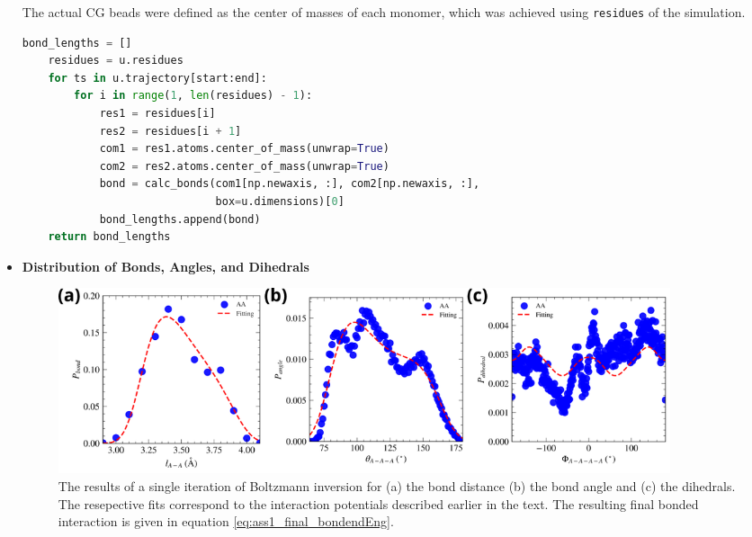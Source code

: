 \documentclass[10pt,a4paper]{labreport}
\begin{document}
\begin{itemize}
  The actual CG beads were defined as the center of masses of each monomer, which was achieved using \texttt{residues} of the simulation.
  
  \begin{lstlisting}[language=Python, 
    caption={An example on how the CG beads are defined from the all-atom simulation. The example is used when determining the bond lengths of the CG model.},
    label=lst:ass1_residues,
    ]
  bond_lengths = []
    residues = u.residues
    for ts in u.trajectory[start:end]:
        for i in range(1, len(residues) - 1):
            res1 = residues[i]
            res2 = residues[i + 1]
            com1 = res1.atoms.center_of_mass(unwrap=True)
            com2 = res2.atoms.center_of_mass(unwrap=True)
            bond = calc_bonds(com1[np.newaxis, :], com2[np.newaxis, :], 
                              box=u.dimensions)[0]
            bond_lengths.append(bond)
    return bond_lengths
  \end{lstlisting}
  
  \item \textbf{Distribution of Bonds, Angles, and Dihedrals}
  \begin{figure}[h]
    \centering 
    \includegraphics[width = 0.9\textwidth]{figs/ass1_probs.png}
    \caption{The results of a single iteration of Boltzmann inversion for (a) the bond distance (b) the bond angle and (c) the dihedrals. The resepective fits correspond to the interaction potentials described earlier in the text. The resulting final bonded interaction is given in equation \eqref{eq:ass1_final_bondendEng}.}
    \label{fig:ass1_distribs}
  \end{figure}


\end{itemize}
\end{document}
